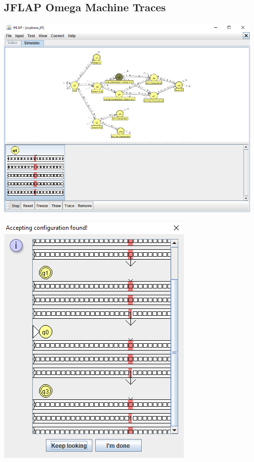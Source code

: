 \documentclass[12pt]{article}
\begin{document}
	
	\subsection{JFLAP Omega Machine Traces}
	\label{app:trace}
	\includegraphics[width=\linewidth]{rum-tm-trace}
	\smallskip\par
	\includegraphics[width=0.4\linewidth]{lie-tm-trace}
	
\end{document}

